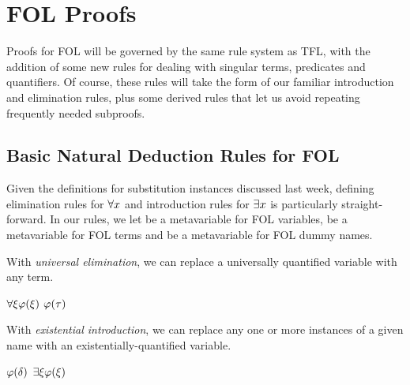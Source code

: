 \section{FOL Proofs}

Proofs for FOL will be governed by the same rule system as TFL, with the
addition of some new rules for dealing with singular terms, predicates and
quantifiers. Of course, these rules will take the form of our familiar
introduction and elimination rules, plus some derived rules that let us avoid
repeating frequently needed subproofs.


\subsection{Basic Natural Deduction Rules for FOL}


Given the definitions for substitution instances discussed last week, defining
elimination rules for $\forall x$ and introduction rules for $\exists x$ is
particularly straight-forward. In our rules, we let \exi be a metavariable for
FOL variables, \etau be a metavariable for FOL terms and \edelta be a
metavariable for FOL dummy names.

With \emph{universal elimination}, we can replace a universally quantified
variable with any term.

\begin{fitchrule}
  \label{def:universal-elimination-rule}
  \leavevmode
  \vspace{-0.9\baselineskip}
  \begin{fitchproof}
     {$\forall\xi\varphi(\xi)$}
     {$\varphi(\tau)$} 
  \end{fitchproof}
\end{fitchrule}

With \emph{existential introduction}, we can replace any one or more instances
of a given name with an existentially-quantified variable.

\begin{fitchrule}
  \label{def:existential-introduction-rule}
  \leavevmode
  \vspace{-0.9\baselineskip}
  \begin{fitchproof}
     {$\varphi(\delta)$}    
     {$\exists\xi\varphi(\xi)$} 
  \end{fitchproof}
\end{fitchrule}

